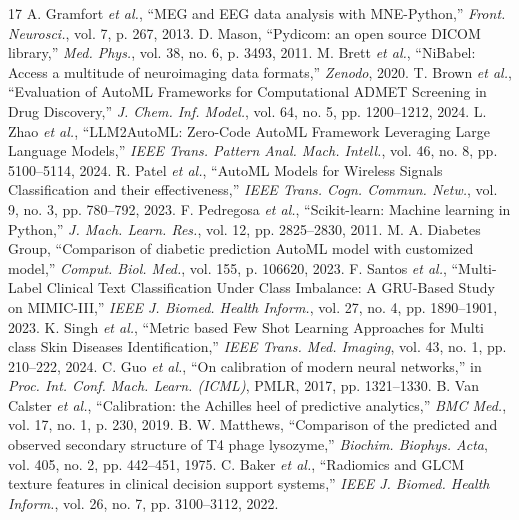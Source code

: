 \documentclass[conference]{IEEEtran}
\begin{document}
\begin{thebibliography}{17}
 A. Gramfort \textit{et al.}, ``MEG and EEG data analysis with MNE-Python,'' \textit{Front. Neurosci.}, vol. 7, p. 267, 2013.
 D. Mason, ``Pydicom: an open source DICOM library,'' \textit{Med. Phys.}, vol. 38, no. 6, p. 3493, 2011.
 M. Brett \textit{et al.}, ``NiBabel: Access a multitude of neuroimaging data formats,'' \textit{Zenodo}, 2020.
 T. Brown \textit{et al.}, ``Evaluation of AutoML Frameworks for Computational ADMET Screening in Drug Discovery,'' \textit{J. Chem. Inf. Model.}, vol. 64, no. 5, pp. 1200--1212, 2024.
 L. Zhao \textit{et al.}, ``LLM2AutoML: Zero-Code AutoML Framework Leveraging Large Language Models,'' \textit{IEEE Trans. Pattern Anal. Mach. Intell.}, vol. 46, no. 8, pp. 5100--5114, 2024.
 R. Patel \textit{et al.}, ``AutoML Models for Wireless Signals Classification and their effectiveness,'' \textit{IEEE Trans. Cogn. Commun. Netw.}, vol. 9, no. 3, pp. 780--792, 2023.
 F. Pedregosa \textit{et al.}, ``Scikit-learn: Machine learning in Python,'' \textit{J. Mach. Learn. Res.}, vol. 12, pp. 2825--2830, 2011.
 M. A. Diabetes Group, ``Comparison of diabetic prediction AutoML model with customized model,'' \textit{Comput. Biol. Med.}, vol. 155, p. 106620, 2023.
 F. Santos \textit{et al.}, ``Multi-Label Clinical Text Classification Under Class Imbalance: A GRU-Based Study on MIMIC-III,'' \textit{IEEE J. Biomed. Health Inform.}, vol. 27, no. 4, pp. 1890--1901, 2023.
 K. Singh \textit{et al.}, ``Metric based Few Shot Learning Approaches for Multi class Skin Diseases Identification,'' \textit{IEEE Trans. Med. Imaging}, vol. 43, no. 1, pp. 210--222, 2024.
 C. Guo \textit{et al.}, ``On calibration of modern neural networks,'' in \textit{Proc. Int. Conf. Mach. Learn. (ICML)}, PMLR, 2017, pp. 1321--1330.
 B. Van Calster \textit{et al.}, ``Calibration: the Achilles heel of predictive analytics,'' \textit{BMC Med.}, vol. 17, no. 1, p. 230, 2019.
 B. W. Matthews, ``Comparison of the predicted and observed secondary structure of T4 phage lysozyme,'' \textit{Biochim. Biophys. Acta}, vol. 405, no. 2, pp. 442--451, 1975.
 C. Baker \textit{et al.}, ``Radiomics and GLCM texture features in clinical decision support systems,'' \textit{IEEE J. Biomed. Health Inform.}, vol. 26, no. 7, pp. 3100--3112, 2022.

\end{thebibliography}
\end{document}
